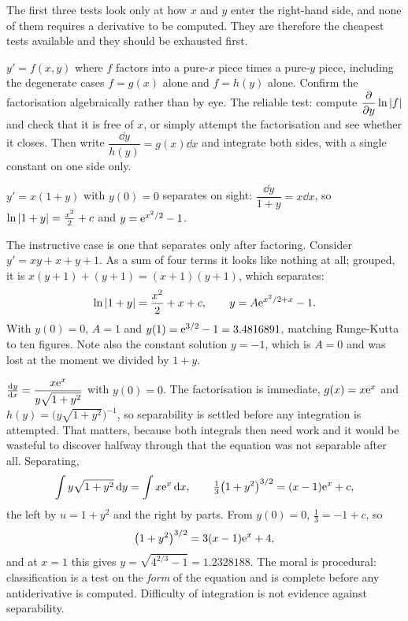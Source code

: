 The first three tests look only at how $x$ and $y$ enter the right-hand side, and none of them requires a derivative to be computed. They are therefore the cheapest tests available and they should be exhausted first.

\cue $y'=f(x,y)$ where $f$ factors into a pure-$x$ piece times a pure-$y$ piece, including the degenerate cases $f=g(x)$ alone and $f=h(y)$ alone.
\method Confirm the factorisation algebraically rather than by eye. The reliable test: compute $\dfrac{\partial}{\partial y}\ln\left\lvert f\right\rvert$ and check that it is free of $x$, or simply attempt the factorisation and see whether it closes. Then write $\dfrac{\dd y}{h(y)}=g(x)\dd x$ and integrate both sides, with a single constant on one side only.

\begin{worked}
$y'=x(1+y)$ with $y(0)=0$ separates on sight: $\dfrac{\dd y}{1+y}=x\dd x$, so $\ln\left\lvert 1+y\right\rvert=\tfrac{x^{2}}{2}+c$ and $y=\mathrm{e}^{x^{2}/2}-1$.

The instructive case is one that separates only after factoring. Consider $y'=xy+x+y+1$. As a sum of four terms it looks like nothing at all; grouped, it is $x(y+1)+(y+1)=(x+1)(y+1)$, which separates:
\[\ln\left\lvert 1+y\right\rvert=\frac{x^{2}}{2}+x+c,\qquad y=A\mathrm{e}^{x^{2}/2+x}-1.\]
With $y(0)=0$, $A=1$ and $y(1)=\mathrm{e}^{3/2}-1=3.4816891$, matching Runge-Kutta to ten figures. Note also the constant solution $y=-1$, which is $A=0$ and was lost at the moment we divided by $1+y$.
\end{worked}

\begin{worked}
$\frac{\mathrm{d}y}{\mathrm{d}x}=\dfrac{x\mathrm{e}^{x}}{y\sqrt{1+y^{2}}}$ with $y(0)=0$. The factorisation is immediate, $g(x)=x\mathrm{e}^{x}$ and $h(y)=\bigl(y\sqrt{1+y^{2}}\bigr)^{-1}$, so separability is settled before any integration is attempted. That matters, because both integrals then need work and it would be wasteful to discover halfway through that the equation was not separable after all. Separating,
\[\int y\sqrt{1+y^{2}}\,\mathrm{d} y=\int x\mathrm{e}^{x}\,\mathrm{d} x,\qquad \tfrac13\bigl(1+y^{2}\bigr)^{3/2}=(x-1)\mathrm{e}^{x}+c,\]
the left by $u=1+y^{2}$ and the right by parts. From $y(0)=0$, $\tfrac13=-1+c$, so
\[\bigl(1+y^{2}\bigr)^{3/2}=3(x-1)\mathrm{e}^{x}+4,\]
and at $x=1$ this gives $y=\sqrt{4^{2/3}-1}=1.2328188$. The moral is procedural: classification is a test on the \emph{form} of the equation and is complete before any antiderivative is computed. Difficulty of integration is not evidence against separability.
\end{worked}

